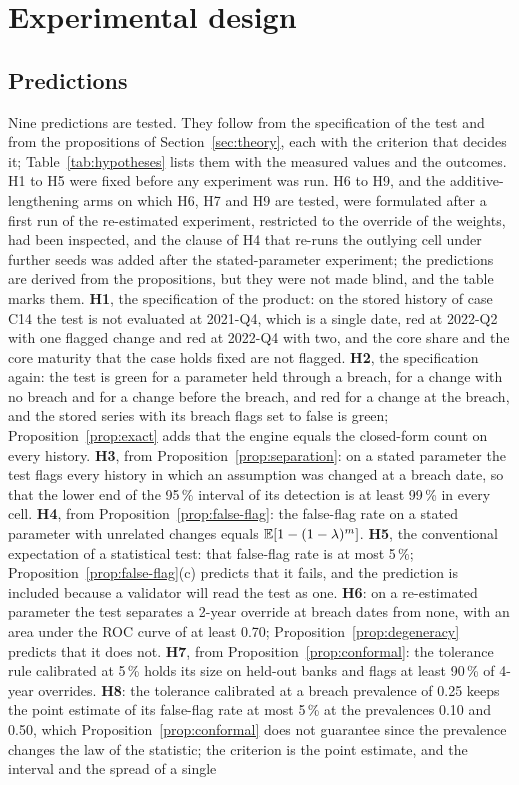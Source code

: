 \section{Experimental design}
\label{sec:experimental-design}

\subsection{Predictions}
\label{sec:design-hypotheses}

Nine predictions are tested. They follow from the specification of the test and from the propositions of Section~\ref{sec:theory}, each with the criterion that decides it; Table~\ref{tab:hypotheses} lists them with the measured values and the outcomes. H1 to H5 were fixed before any experiment was run. H6 to H9, and the additive-lengthening arms on which H6, H7 and H9 are tested, were formulated after a first run of the re-estimated experiment, restricted to the override of the weights, had been inspected, and the clause of H4 that re-runs the outlying cell under further seeds was added after the stated-parameter experiment; the predictions are derived from the propositions, but they were not made blind, and the table marks them. \textbf{H1}, the specification of the product: on the stored history of case C14 the test is not evaluated at 2021-Q4, which is a single date, red at 2022-Q2 with one flagged change and red at 2022-Q4 with two, and the core share and the core maturity that the case holds fixed are not flagged. \textbf{H2}, the specification again: the test is green for a parameter held through a breach, for a change with no breach and for a change before the breach, and red for a change at the breach, and the stored series with its breach flags set to false is green; Proposition~\ref{prop:exact} adds that the engine equals the closed-form count on every history. \textbf{H3}, from Proposition~\ref{prop:separation}: on a stated parameter the test flags every history in which an assumption was changed at a breach date, so that the lower end of the 95\,\% interval of its detection is at least 99\,\% in every cell. \textbf{H4}, from Proposition~\ref{prop:false-flag}: the false-flag rate on a stated parameter with unrelated changes equals $\mathbb{E}[1-(1-\lambda)^m]$. \textbf{H5}, the conventional expectation of a statistical test: that false-flag rate is at most 5\,\%; Proposition~\ref{prop:false-flag}(c) predicts that it fails, and the prediction is included because a validator will read the test as one. \textbf{H6}: on a re-estimated parameter the test separates a 2-year override at breach dates from none, with an area under the ROC curve of at least 0.70; Proposition~\ref{prop:degeneracy} predicts that it does not. \textbf{H7}, from Proposition~\ref{prop:conformal}: the tolerance rule calibrated at 5\,\% holds its size on held-out banks and flags at least 90\,\% of 4-year overrides. \textbf{H8}: the tolerance calibrated at a breach prevalence of 0.25 keeps the point estimate of its false-flag rate at most 5\,\% at the prevalences 0.10 and 0.50, which Proposition~\ref{prop:conformal} does not guarantee since the prevalence changes the law of the statistic; the criterion is the point estimate, and the interval and the spread of a single 